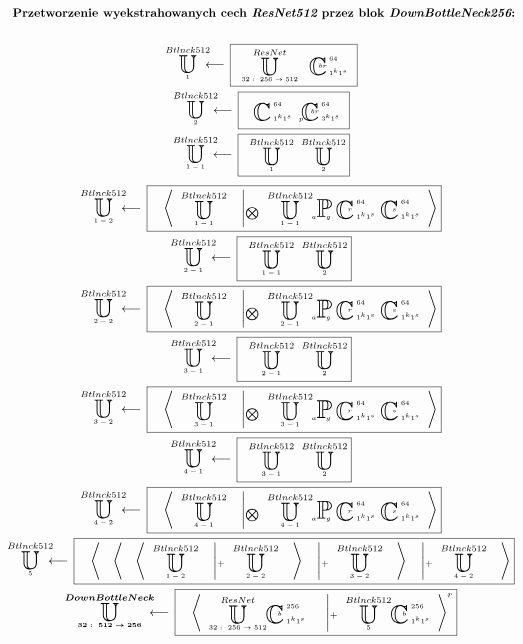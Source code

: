 \begin{equation*}
\begin{gathered}
\textbf{Przetworzenie wyekstrahowanych cech $\textit{ResNet512}$ przez blok $\textit{DownBottleNeck256}$:}
\\~\\
\xunitdef{Btlnck512}{1}{\quad
\xunit{ResNet}{32:\ 256\rightarrow512}{} \quad
\xconv{\ 1^k1^s}{\ 64}{}{}{br}}
\\
\xunitdef{Btlnck512}{2}{\quad
\xconv{\ 1^k1^s}{\ 64}{}{}{}
\xconv{\ 3^k1^s}{\ 64}{p}{}{br}}
\\
\xunitdef{Btlnck512}{1-1}{\quad
\xunit{Btlnck512}{1}{} \quad
\xunit{Btlnck512}{2}{}}
\end{gathered}
\end{equation*}
\begin{equation*}
\begin{gathered}
\xunitdef{Btlnck512}{1-2}{\quad
\xaggreg{\quad
\xunit{Btlnck512}{1-1}{}
\quad \left|_{\bigotimes} \quad
\xunit{Btlnck512}{1-1}{}
\xpool{g}{}{a}{}{}
\xconv{\ 1^k1^s}{\ 64}{}{}{r}
\xconv{\ 1^k1^s}{\ 64}{}{}{s}
\right.}}
\\
\xunitdef{Btlnck512}{2-1}{\quad
\xunit{Btlnck512}{1-1}{} \quad
\xunit{Btlnck512}{2}{}}
\\
\xunitdef{Btlnck512}{2-2}{\quad
\xaggreg{\quad
\xunit{Btlnck512}{2-1}{}
\quad \left|_{\bigotimes} \quad
\xunit{Btlnck512}{2-1}{}
\xpool{g}{}{a}{}{}
\xconv{\ 1^k1^s}{\ 64}{}{}{r}
\xconv{\ 1^k1^s}{\ 64}{}{}{s}
\right.}}
\\
\xunitdef{Btlnck512}{3-1}{\quad
\xunit{Btlnck512}{2-1}{} \quad
\xunit{Btlnck512}{2}{}}
\\
\xunitdef{Btlnck512}{3-2}{\quad
\xaggreg{\quad
\xunit{Btlnck512}{3-1}{}
\quad \left|_{\bigotimes} \quad
\xunit{Btlnck512}{3-1}{}
\xpool{g}{}{a}{}{}
\xconv{\ 1^k1^s}{\ 64}{}{}{r}
\xconv{\ 1^k1^s}{\ 64}{}{}{s}
\right.}}
\\
\xunitdef{Btlnck512}{4-1}{\quad
\xunit{Btlnck512}{3-1}{} \quad
\xunit{Btlnck512}{2}{}}
\\
\xunitdef{Btlnck512}{4-2}{\quad
\xaggreg{\quad
\xunit{Btlnck512}{4-1}{}
\quad \left|_{\bigotimes} \quad
\xunit{Btlnck512}{4-1}{}
\xpool{g}{}{a}{}{}
\xconv{\ 1^k1^s}{\ 64}{}{}{r}
\xconv{\ 1^k1^s}{\ 64}{}{}{s}
\right.}}
\\
\xunitdef{Btlnck512}{5}{\quad
\xaggreg{\quad
\xaggreg{\quad
\xaggreg{\quad
\xunit{Btlnck512}{1-2}{}
\quad \left|_+ \quad
\xunit{Btlnck512}{2-2}{}
\right.\quad}
\quad \left|_+ \quad
\xunit{Btlnck512}{3-2}{}
\right.\quad}
\quad \left|_+ \quad
\xunit{Btlnck512}{4-2}{}
\right.\quad}}
\\
\xunitdef{\boldsymbol{DownBottleNeck}}{\boldsymbol{32:\ 512\rightarrow256}}{\quad
\xaggreg{\quad
\xunit{ResNet}{32:\ 256\rightarrow512}{}
\xconv{\ 1^k1^s}{\ 256}{}{}{b}
\quad \left|_+ \quad
\xunit{Btlnck512}{5}{}
\xconv{\ 1^k1^s}{\ 256}{}{}{b}
\right.}^r}
\end{gathered}
\end{equation*}
